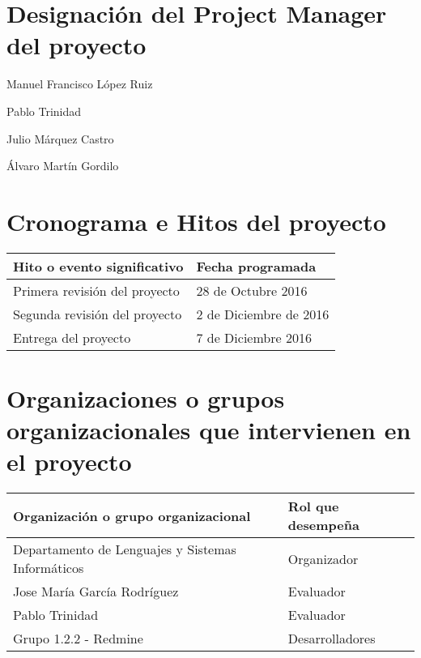 \documentclass[a4paper,10pt]{scrartcl}
\begin{document}
\section{Designación del Project Manager del proyecto}

\begin{description}[align=right, labelwidth=4cm]
	\item [Nombre] Manuel Francisco López Ruiz
	\item [Reporta a] Pablo Trinidad
	\item [Supervisa a] Julio Márquez Castro
	\item [Supervisa a] Álvaro Martín Gordilo
\end{description}


\section{Cronograma e Hitos del proyecto}

\begin{center}
	\begin{tabular}{| l | l |}
		\hline	
		\textbf{Hito o evento significativo} & \textbf{Fecha programada} \\ \hline
		Primera revisión del proyecto & 28 de Octubre 2016 \\ \hline
		Segunda revisión del proyecto & 2 de Diciembre de 2016 \\ \hline
 		Entrega del proyecto & 7 de Diciembre 2016 \\ \hline
	\end{tabular}
\end{center}

\section{Organizaciones o grupos organizacionales que intervienen en el proyecto}
\begin{center}
	\begin{tabular}{| l | l |}
		\hline	
		\textbf{Organización o grupo organizacional} & \textbf{Rol que desempeña} \\ \hline
		Departamento de Lenguajes y Sistemas Informáticos & Organizador \\ \hline
		Jose María García Rodríguez & Evaluador \\ \hline
		Pablo Trinidad & Evaluador \\ \hline
		Grupo 1.2.2 - Redmine & Desarrolladores \\ \hline
	\end{tabular}
\end{center}
\end{document}
